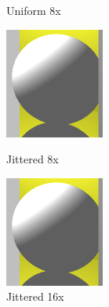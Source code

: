 \begin{figure}[H]
    \caption{Uniform 8x}
    \label{fig:aa_uniform_zoom}
\endminipage\hfill
{}
    \centering
    \includegraphics[width=\linewidth]{img/antialiasing/sto8x.png}
    \caption{Jittered 8x}
\endminipage\hfill
{}
    \centering
    \includegraphics[width=\linewidth]{img/antialiasing/sto16x.png}
    \caption{Jittered 16x}
\endminipage\hfill
\end{figure}

